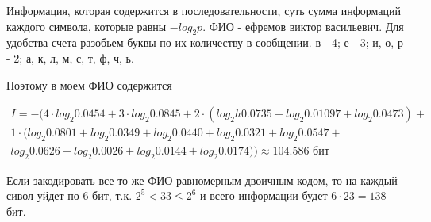 \documentclass[a4paper,12pt]{article}
\begin{document}
Информация, которая содержится в последовательности, суть сумма информаций каждого символа, которые равны $- log_2 p$.
ФИО - ефремов виктор васильевич.
Для удобства счета разобьем буквы по их количеству в сообщении.
в - 4; е - 3; и, о, р - 2; а, к, л, м, с, т, ф, ч, ь.

\newpage

Поэтому в моем ФИО содержится

\begin{gather*}
I = - \bigl( 4 \cdot log_2 0.0454 + 3 \cdot log_2 0.0845 + 2 \cdot (log_2 h0.0735 + log_2 0.01097 + log_2 0.0473) + \\
1 \cdot (log_2 0.0801 + log_2 0.0349 + log_2 0.0440 + log_2 0.0321 + log_2 0.0547 + \\
log_2 0.0626 + log_2 0.0026 + log_2 0.0144 + log_2 0.0174) \bigr) \approx 104.586 \text{ бит}
\end{gather*}

Если закодировать все то же ФИО равномерным двоичным кодом, то на каждый сивол уйдет по 6 бит, т.к. $2^5 < 33 \leq 2^6$ и всего информации будет $6 \cdot 23 = 138$ бит.
\end{document}
